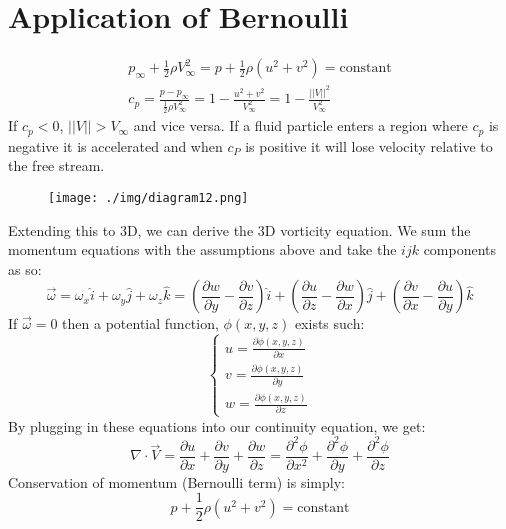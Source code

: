 \section{Application of Bernoulli}
\begin{gather}
  p_\infty + \frac{1}{2} \rho V_\infty^2 = p + \frac{1}{2} \rho (u^2 + v^2) = \textrm{constant}\\
  c_p = \frac{p - p_{\infty}}{\frac{1}{2} \rho V_{\infty}^2} = 1 - \frac{u^2 + v^2}{V_\infty^2} = 1 - \frac{||V||^2}{V_\infty^2}
\end{gather}
If $c_p < 0$, $||V|| > V_\infty$ and vice versa. If a fluid particle enters a region where $c_p$ is negative it is accelerated and when $c_P$ is positive it will lose velocity relative to the free stream.
\begin{figure}[H]
  \centering
  \texttt{[image: ./img/diagram12.png]}
\end{figure}
Extending this to 3D, we can derive the 3D vorticity equation. We sum the momentum equations with the assumptions above and take the $ijk$ components as so:
\begin{equation}
  \vec{\omega} = \omega_x \hat{i} + \omega_y \hat{j} + \omega_z \hat{k} = \left( \frac{\partial w}{\partial y} - \frac{\partial v}{\partial z}\right) \hat{i} + \left( \frac{\partial u}{\partial z} - \frac{\partial w}{\partial x}\right) \hat{j} + \left(\frac{\partial v}{\partial x} - \frac{\partial u}{\partial y} \right) \hat{k}
\end{equation}
If $\vec{\omega} = 0$ then a potential function, $\phi(x, y, z)$ exists such:
\begin{equation}
  \begin{cases}
    u = \frac{\partial \phi (x,y,z)}{\partial x} \\
    v = \frac{\partial \phi (x,y,z)}{\partial y} \\
    w = \frac{\partial \phi (x,y,z)}{\partial z}
  \end{cases}
\end{equation}
By plugging in these equations into our continuity equation, we get:
\begin{equation}
  \nabla \cdot \vec{V} = \frac{\partial u}{\partial x} + \frac{\partial v}{\partial y} + \frac{\partial w}{\partial z} = \frac{\partial^2 \phi}{\partial x^2} + \frac{\partial^2 \phi}{\partial y} + \frac{\partial^2 \phi}{\partial z}
\end{equation}
Conservation of momentum (Bernoulli term) is simply:
\begin{equation}
  p + \frac{1}{2} \rho (u^2 + v^2) = \textrm{constant}
\end{equation}

